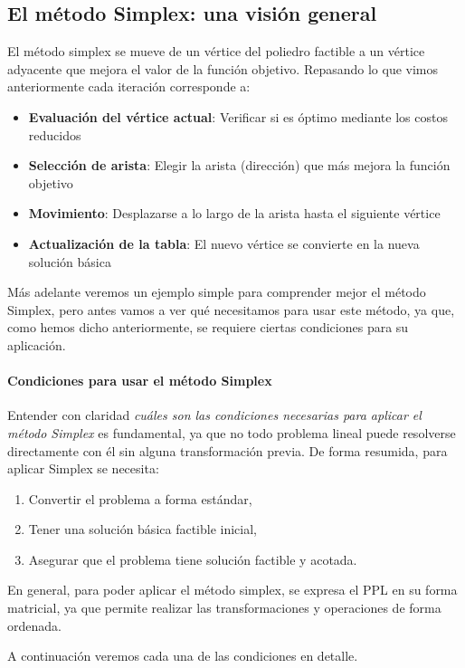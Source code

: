 \subsection{El método Simplex: una visión general}
\label{sec:simplex}

El método simplex se mueve de un vértice del poliedro factible a un vértice adyacente que mejora el valor de la función objetivo. Repasando lo que vimos anteriormente cada iteración corresponde a:
\begin{itemize}
  \item \textbf{Evaluación del vértice actual}: Verificar si es óptimo mediante los costos reducidos
  \item \textbf{Selección de arista}: Elegir la arista (dirección) que más mejora la función objetivo
  \item \textbf{Movimiento}: Desplazarse a lo largo de la arista hasta el siguiente vértice
  \item \textbf{Actualización de la tabla}: El nuevo vértice se convierte en la nueva solución básica
\end{itemize}
Más adelante veremos un ejemplo simple para comprender mejor el método Simplex, pero antes vamos a ver qué necesitamos para usar este método, ya que, como hemos dicho anteriormente, se requiere ciertas condiciones para su aplicación.

\paragraph{Condiciones para usar el método Simplex}

Entender con claridad \textit{cuáles son las condiciones necesarias para aplicar el método Simplex} es fundamental, ya que no todo problema lineal puede resolverse directamente con él sin alguna transformación previa. De forma resumida, para aplicar Simplex se necesita:
\begin{enumerate}
  \item Convertir el problema a forma estándar,
  \item Tener una solución básica factible inicial,
  \item Asegurar que el problema tiene solución factible y acotada.
\end{enumerate}
En general, para poder aplicar el método simplex, se expresa el PPL en su forma matricial, ya que permite realizar las transformaciones y operaciones de forma ordenada.

A continuación veremos cada una de las condiciones en detalle.

